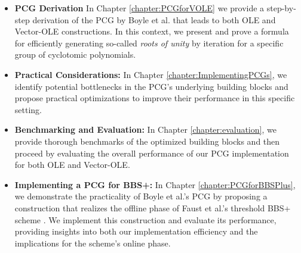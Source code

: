 \begin{itemize}
\item \textbf{PCG Derivation} In Chapter \ref{chapter:PCGforVOLE} we provide a step-by-step derivation of the PCG by Boyle et al. that leads to both OLE and Vector-OLE constructions. In this context, we present and prove a formula for efficiently generating so-called \textit{roots of unity} by iteration for a specific group of cyclotomic polynomials.
\item \textbf{Practical Considerations:} In Chapter \ref{chapter:ImplementingPCGs}, we identify potential bottlenecks in the PCG's underlying building blocks and propose practical optimizations to improve their performance in this specific setting.
\item \textbf{Benchmarking and Evaluation:} In Chapter \ref{chapter:evaluation}, we provide thorough benchmarks of the optimized building blocks and then proceed by evaluating the overall performance of our PCG implementation for both OLE and Vector-OLE.
\item \textbf{Implementing a PCG for BBS+:} In Chapter \ref{chapter:PCGforBBSPlus}, we demonstrate the practicality of Boyle et al.'s PCG by proposing a construction that realizes the offline phase of Faust et al.'s threshold BBS+ scheme \cite{cryptoeprint:2023/1076}. We implement this construction and evaluate its performance, providing insights into both our implementation efficiency and the implications for the scheme's online phase.
\end{itemize}

